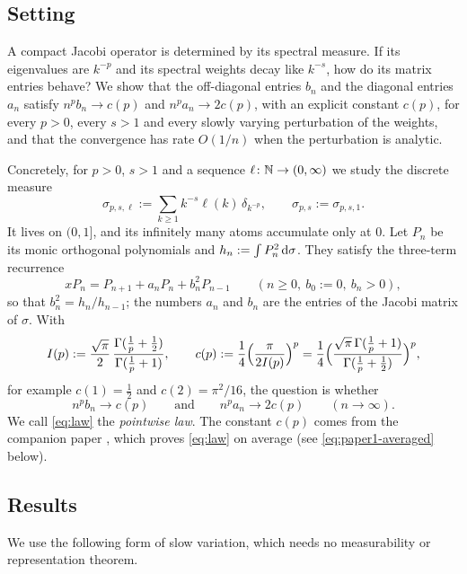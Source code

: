 \subsection{Setting}\label{sec:setting}
A compact Jacobi operator is determined by its spectral measure. If its eigenvalues are $k^{-p}$ and its spectral
weights decay like $k^{-s}$, how do its matrix entries behave? We show that the off-diagonal entries $b_n$ and the
diagonal entries $a_n$ satisfy $n^pb_n\to c(p)$ and $n^pa_n\to2c(p)$, with an explicit constant $c(p)$, for every
$p>0$, every $s>1$ and every slowly varying perturbation of the weights, and that the convergence has rate $O(1/n)$
when the perturbation is analytic.

Concretely, for $p>0$, $s>1$ and a sequence $\ell\colon\mathbb{N}\to(0,\infty)$ we study the discrete measure
\begin{equation}\label{eq:sigma}
  \sigma_{p,s,\ell}:=\sum_{k\ge1}k^{-s}\ell(k)\,\delta_{k^{-p}},\qquad \sigma_{p,s}:=\sigma_{p,s,1}.
\end{equation}
It lives on $(0,1]$, and its infinitely many atoms accumulate only at $0$. Let $P_n$ be its monic orthogonal
polynomials and $h_n:=\int P_n^2\,\mathrm{d}\sigma$. They satisfy the three-term recurrence
\begin{equation}\label{eq:jacobi}
  xP_n=P_{n+1}+a_nP_n+b_n^2P_{n-1}\qquad(n\ge0,\ b_0:=0,\ b_n>0),
\end{equation}
so that $b_n^2=h_n/h_{n-1}$; the numbers $a_n$ and $b_n$ are the entries of the Jacobi matrix of $\sigma$. With
\begin{equation}\label{eq:cp}
  I(p):=\frac{\sqrt\pi}{2}\,\frac{\Gamma(\frac1p+\frac12)}{\Gamma(\frac1p+1)},\qquad
  c(p):=\frac14\Bigl(\frac{\pi}{2I(p)}\Bigr)^{p}
  =\frac14\Bigl(\frac{\sqrt\pi\,\Gamma(\frac1p+1)}{\Gamma(\frac1p+\frac12)}\Bigr)^{p},
\end{equation}
for example $c(1)=\frac12$ and $c(2)=\pi^2/16$, the question is whether
\begin{equation}\label{eq:law}
  n^pb_n\longrightarrow c(p)\qquad\text{and}\qquad n^pa_n\longrightarrow2c(p)\qquad(n\to\infty).
\end{equation}
We call \eqref{eq:law} the \emph{pointwise law}. The constant $c(p)$ comes from the companion paper \cite{Paper1},
which proves \eqref{eq:law} on average (see \eqref{eq:paper1-averaged} below).

\subsection{Results}\label{sec:results}
We use the following form of slow variation, which needs no measurability or representation theorem.

